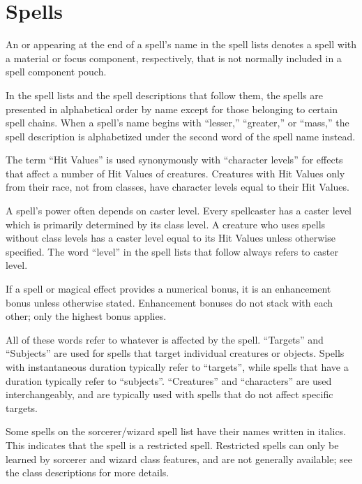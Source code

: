 \chapter{Spells}

An \M{} or \F{} appearing at the end of a spell's name in the spell lists denotes a spell with a material or focus component, respectively, that is not normally included in a spell component pouch.

 In the spell lists and the spell descriptions that follow them, the spells are presented in alphabetical order by name except for those belonging to certain spell chains.
When a spell's name begins with ``lesser,'' ``greater,'' or ``mass,'' the spell description is alphabetized under the second word of the spell name instead.

 The term ``Hit Values'' is used synonymously with ``character levels'' for effects that affect a number of Hit Values of creatures. Creatures with Hit Values only from their race, not from classes, have character levels equal to their Hit Values.

 A spell's power often depends on caster level. Every spellcaster has a caster level which is primarily determined by its class level. A creature who uses spells without class levels has a caster level equal to its Hit Values unless otherwise specified. The word ``level'' in the spell lists that follow always refers to caster level.

 If a spell or magical effect provides a numerical bonus, it is an enhancement bonus unless otherwise stated. Enhancement bonuses do not stack with each other; only the highest bonus applies.

 All of these words refer to whatever is affected by the spell. ``Targets'' and ``Subjects'' are used for spells that target individual creatures or objects. Spells with instantaneous duration typically refer to ``targets'', while spells that have a duration typically refer to ``subjects''. ``Creatures'' and ``characters'' are used interchangeably, and are typically used with spells that do not affect specific targets.

 Some spells on the sorcerer/wizard spell list have their names written in italics. This indicates that the spell is a restricted spell. Restricted spells can only be learned by sorcerer and wizard class features, and are not generally available; see the class descriptions for more details.

